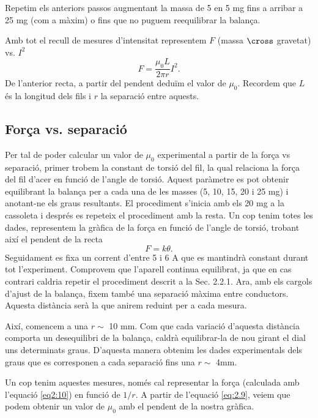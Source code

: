 \documentclass[a4paper,10.5pt]{report}
\begin{document}
Repetim els anteriors passos augmentant la massa de 5 en 5 mg fins a arribar a 25 mg (com a màxim) o fins que no puguem reequilibrar la balança.

Amb tot el recull de mesures d'intensitat representem $F$ (massa $\cross$ gravetat) vs. $I^2$
\begin{equation}
	F = \frac{\mu_0L}{2\pi r}I^2. \label{eq:2.9}
\end{equation}
De l'anterior recta, a partir del pendent deduïm el valor de $\mu_0$. Recordem que $L$ és la longitud dels fils i $r$ la separació entre aquests.

\subsection{Força vs. separació}
Per tal de poder calcular un valor de $\mu_0$ experimental a partir de la força vs separació, primer trobem la constant de torsió del fil, la qual relaciona la força del fil d'acer en funció de l'angle de torsió. Aquest paràmetre es pot obtenir equilibrant la balança per a cada una de les masses (5, 10, 15, 20 i 25 mg) i anotant-ne els graus resultants. El procediment s'inicia amb els 20 mg a la cassoleta i després es repeteix el procediment amb la resta. Un cop tenim totes les dades, representem la gràfica de la força en funció de l'angle de torsió, trobant així el pendent de la recta 
\begin{equation}
	F=k\theta.
	\label{eq2:10}
\end{equation}
Seguidament es fixa un corrent d'entre 5 i 6 A que es mantindrà constant durant tot l'experiment. Comprovem que l'aparell continua equilibrat, ja que en cas contrari caldria repetir el procediment descrit a la Sec. 2.2.1. Ara, amb els cargols d'ajust de la balança, fixem també una separació màxima entre conductors. Aquesta distància serà la que anirem reduint per a cada mesura.

Així, comencem a una $r \sim$ 10 mm. Com que cada variació d'aquesta distància comporta un desequilibri de la balança, caldrà equilibrar-la de nou girant el dial uns determinats graus. D'aquesta manera obtenim les dades experimentals dels graus que es corresponen a cada separació fins una $r \sim$ 4mm. 

Un cop tenim aquestes mesures, només cal representar la força (calculada amb l'equació \eqref{eq2:10}) en funció de $1/r$. A partir de l'equació \eqref{eq:2.9}, veiem que podem obtenir un valor de $\mu_0$ amb el pendent de la nostra gràfica.
\end{document}
